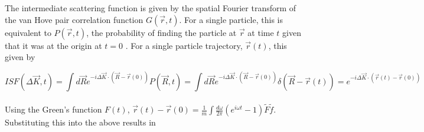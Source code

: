 The intermediate scattering function is given by the spatial Fourier transform of the van Hove pair correlation function $G\left(\vec{r},t\right)$. For a single particle, this is equivalent to $P\left(\vec{r}, t\right)$, the probability of finding the particle at $\vec{r}$ at time $t$ given that it was at the origin at $t=0$ \cite{vanhove}. For a single particle trajectory, $\vec{r}(t)$, this given by 

$$
ISF(\Delta \vec{K}, t) = \int d\vec{R} e^{-i \Delta \vec{K} \cdot \left(\vec{R} - \vec{r}(0)\right)} P(\vec{R}, t) = \int d\vec{R} e^{-i \Delta \vec{K} \cdot \left(\vec{R} - \vec{r}(0)\right)} \delta(\vec{R} - \vec{r}(t)) = e^{-i \Delta \vec{K} \cdot \left(\vec{r}(t) - \vec{r}(0)\right)}
$$
\\
Using the Green's function $F(t)$, $\vec{r}(t) - \vec{r}(0) = \frac{1}{m} \int \frac{d\omega}{2\pi} \left(e^{i\omega t} - 1\right) \tilde{F} \tilde{f}$. Substituting this into the above results in

